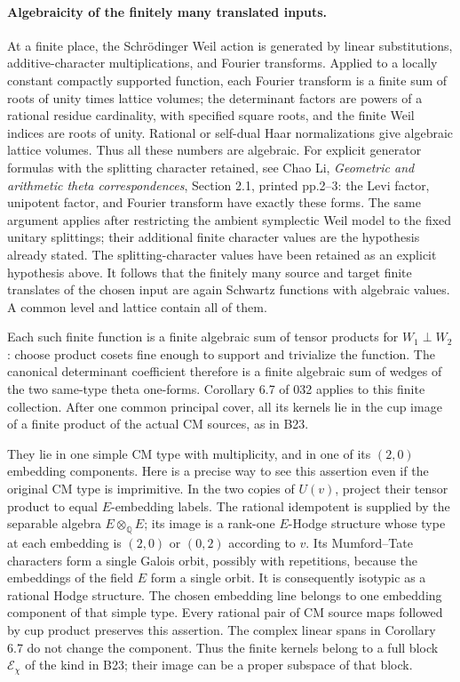 \documentclass[11pt]{article}
\newcommand{\Q}{\mathbb Q}\newcommand{\C}{\mathbb C}\newcommand{\Z}{\mathbb Z}\newcommand{\R}{\mathbb R}\newcommand{\A}{\mathbb A}\newcommand{\OO}{\mathcal O}
\theoremstyle{definition}\newtheorem{definition}[theorem]{Definition}\newtheorem{remark}[theorem]{Remark}
\begin{document}
\paragraph{Algebraicity of the finitely many translated inputs.}
At a finite place, the Schr\"odinger Weil action is
generated by linear substitutions, additive-character
multiplications, and Fourier transforms.  Applied to
a locally constant compactly supported function,
each Fourier transform is a finite sum of roots of
unity times lattice volumes; the determinant factors
are powers of a rational residue cardinality, with
specified square roots, and the finite Weil indices
are roots of unity.  Rational or self-dual Haar
normalizations give algebraic lattice volumes.
Thus all these numbers are algebraic.
For explicit generator formulas with the splitting
character retained, see Chao Li, \emph{Geometric and
arithmetic theta correspondences}, Section 2.1,
printed pp.2--3: the Levi factor, unipotent factor,
and Fourier transform have exactly these forms.
The same argument applies after restricting the
ambient symplectic Weil model to the fixed unitary
splittings; their additional finite character
values are the hypothesis already stated.
The splitting-character values have been retained
as an explicit hypothesis above.  It follows that
the finitely many source and target finite translates
of the chosen input are again Schwartz functions
with algebraic values.  A common level and lattice
contain all of them.

Each such finite function is a finite algebraic sum
of tensor products for $W_1\perp W_2$: choose product
cosets fine enough to support and trivialize the
function.  The canonical determinant coefficient
therefore is a finite algebraic sum of wedges of
the two same-type theta one-forms.  Corollary 6.7
of 032 applies to this finite collection.  After
one common principal cover, all its kernels lie
in the cup image of a finite product of the actual
CM sources, as in B23.

They lie in one simple CM type with multiplicity,
and in one of its $(2,0)$ embedding components.
Here is a precise way to see this assertion even
if the original CM type is imprimitive.  In the
two copies of $U(v)$, project their tensor product
to equal $E$-embedding labels.  The rational
idempotent is supplied by the separable algebra
$E\otimes_\Q E$; its image is a rank-one
$E$-Hodge structure whose type at each embedding
is $(2,0)$ or $(0,2)$ according to $v$.  Its
Mumford--Tate characters form a single Galois
orbit, possibly with repetitions, because the
embeddings of the field $E$ form a single orbit.
It is consequently isotypic as a rational Hodge
structure.  The chosen embedding line belongs
to one embedding component of that simple type.
Every rational pair of CM source maps followed
by cup product preserves this assertion.
The complex linear spans in Corollary 6.7 do
not change the component.  Thus the finite
kernels belong to a full block
$\mathcal E_\chi$ of the kind in B23; their
image can be a proper subspace of that block.
\end{document}
